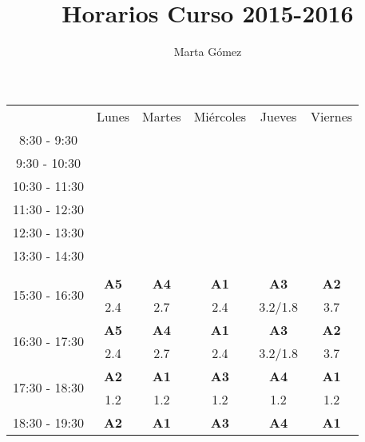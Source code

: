 \documentclass[10pt,spanish, landscape, twocolumn]{article}
\title{Horarios Curso 2015-2016}
\author{Marta Gómez}
\begin{document}
\thispagestyle{empty}

\begin{flushleft}
\begin{tabular}{|c|c|c|c|c|c|}
\hline
\rowcolor{amarillo} \multicolumn{6}{|c|}{\textbf{Primer Cuatrimestre}} \\
\hline
& Lunes & Martes & Miércoles & Jueves & Viernes \\
\hline
\multirow{2}{*}{8:30 - 9:30} & & & & & \\
& & & & &  \\
\hline
\multirow{2}{*}{9:30 - 10:30} & & & & & \\
& & & & & \\
\hline
\multirow{2}{*}{10:30 - 11:30} & & & & & \\
& & & & & \\
\hline
\multirow{2}{*}{11:30 - 12:30} & & & & & \\
& & & & & \\
\hline
\multirow{2}{*}{12:30 - 13:30} & & & & & \\
& & & & & \\
\hline
\multirow{2}{*}{13:30 - 14:30} & & & & & \\
& & & & & \\
\hline
\rowcolor{gris} \multicolumn{6}{|c|}{} \\
\hline
\multirow{2}{*}{15:30 - 16:30} & \textbf{A5} & \textbf{A4} & \textbf{A1} & \textbf{A3} & \textbf{A2} \\
& {\footnotesize 2.4} & {\footnotesize 2.7} & {\footnotesize 2.4} & {\footnotesize 3.2/1.8} & {\footnotesize 3.7} \\
\hline
\multirow{2}{*}{16:30 - 17:30} & \textbf{A5} & \textbf{A4} & \textbf{A1} & \textbf{A3} & \textbf{A2} \\
& {\footnotesize 2.4} & {\footnotesize 2.7} & {\footnotesize 2.4} & {\footnotesize 3.2/1.8} & {\footnotesize 3.7} \\
\hline
\multirow{2}{*}{17:30 - 18:30} & \cellcolor{grisclaro} \textbf{A2} & \cellcolor{grisclaro} \textbf{A1} & \cellcolor{grisclaro} \textbf{A3} & \cellcolor{grisclaro} \textbf{A4} & \cellcolor{grisclaro} \textbf{A1} \\
& \cellcolor{grisclaro} {\footnotesize 1.2}& \cellcolor{grisclaro} {\footnotesize 1.2}& \cellcolor{grisclaro} {\footnotesize 1.2}& \cellcolor{grisclaro} {\footnotesize 1.2}& \cellcolor{grisclaro} {\footnotesize 1.2}\\
\hline
\multirow{2}{*}{18:30 - 19:30} & \cellcolor{grisclaro} \textbf{A2} & \cellcolor{grisclaro} \textbf{A1} & \cellcolor{grisclaro} \textbf{A3} & \cellcolor{grisclaro} \textbf{A4} & \cellcolor{grisclaro} \textbf{A1} \\

\end{tabular}
\end{flushleft}
\end{document}
